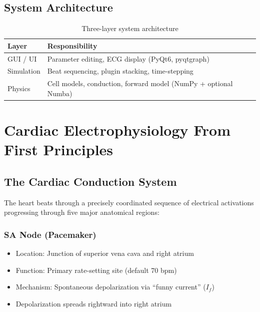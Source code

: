 \documentclass[12pt,oneside,a4paper]{book}
\begin{document}
\section{System Architecture}

\begin{table}[htb]
\centering
\begin{tabularx}{\textwidth}{|l|X|}
\hline
\textbf{Layer} & \textbf{Responsibility} \\
\hline
GUI / UI & Parameter editing, ECG display (PyQt6, pyqtgraph) \\
Simulation & Beat sequencing, plugin stacking, time-stepping \\
Physics & Cell models, conduction, forward model (NumPy + optional Numba) \\
\hline
\end{tabularx}
\caption{Three-layer system architecture}
\label{tab:layers}
\end{table}


\chapter{Cardiac Electrophysiology From First Principles}

\section{The Cardiac Conduction System}

The heart beats through a precisely coordinated sequence of electrical activations progressing through five major anatomical regions:

\subsection{SA Node (Pacemaker)}
\begin{itemize}
  \item Location: Junction of superior vena cava and right atrium
  \item Function: Primary rate-setting site (default 70 bpm)
  \item Mechanism: Spontaneous depolarization via ``funny current'' ($I_f$)
  \item Depolarization spreads rightward into right atrium
\end{itemize}
\end{document}
